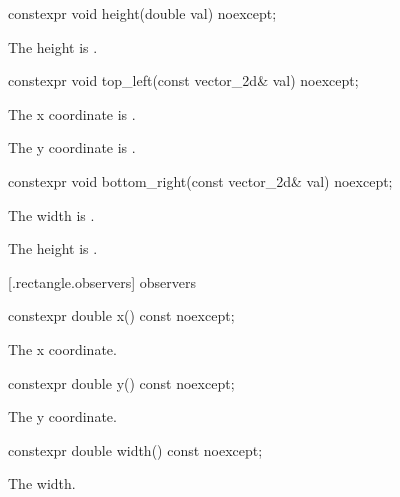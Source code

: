 %
\begin{itemdecl}
constexpr void height(double val) noexcept;
\end{itemdecl}
\begin{itemdescr}
\pnum
\effects
The height is .
\end{itemdescr}

%
\begin{itemdecl}
constexpr void top_left(const vector_2d& val) noexcept;
\end{itemdecl}
\begin{itemdescr}
\pnum
\effects
The x coordinate is .

\effects
The y coordinate is .
\end{itemdescr}

%
\begin{itemdecl}
constexpr void bottom_right(const vector_2d& val) noexcept;
\end{itemdecl}
\begin{itemdescr}
\pnum
\effects
The width is .

\pnum
The height is .
\end{itemdescr}

 [\iotwod.rectangle.observers]{ observers}

%
\begin{itemdecl}
constexpr double x() const noexcept;
\end{itemdecl}
\begin{itemdescr}
\pnum
\returns
The x coordinate.
\end{itemdescr}

%
\begin{itemdecl}
constexpr double y() const noexcept;
\end{itemdecl}
\begin{itemdescr}
\pnum
\returns
The y coordinate.
\end{itemdescr}

%
\begin{itemdecl}
constexpr double width() const noexcept;
\end{itemdecl}
\begin{itemdescr}
\pnum
\returns
The width.
\end{itemdescr}

